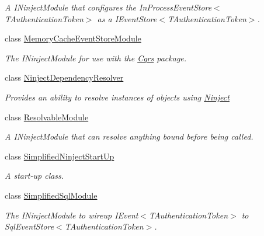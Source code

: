 \begin{DoxyCompactItemize}
\begin{DoxyCompactList}\small\item\em A I\+Ninject\+Module that configures the In\+Process\+Event\+Store$<$\+T\+Authentication\+Token$>$ as a I\+Event\+Store$<$\+T\+Authentication\+Token$>$. \end{DoxyCompactList}\item 
class \hyperlink{classCqrs_1_1Ninject_1_1Configuration_1_1MemoryCacheEventStoreModule}{Memory\+Cache\+Event\+Store\+Module}
\begin{DoxyCompactList}\small\item\em The I\+Ninject\+Module for use with the \hyperlink{namespaceCqrs}{Cqrs} package. \end{DoxyCompactList}\item 
class \hyperlink{classCqrs_1_1Ninject_1_1Configuration_1_1NinjectDependencyResolver}{Ninject\+Dependency\+Resolver}
\begin{DoxyCompactList}\small\item\em Provides an ability to resolve instances of objects using \hyperlink{namespaceCqrs_1_1Ninject}{Ninject} \end{DoxyCompactList}\item 
class \hyperlink{classCqrs_1_1Ninject_1_1Configuration_1_1ResolvableModule}{Resolvable\+Module}
\begin{DoxyCompactList}\small\item\em A I\+Ninject\+Module that can resolve anything bound before being called. \end{DoxyCompactList}\item 
class \hyperlink{classCqrs_1_1Ninject_1_1Configuration_1_1SimplifiedNinjectStartUp}{Simplified\+Ninject\+Start\+Up}
\begin{DoxyCompactList}\small\item\em A start-\/up class. \end{DoxyCompactList}\item 
class \hyperlink{classCqrs_1_1Ninject_1_1Configuration_1_1SimplifiedSqlModule}{Simplified\+Sql\+Module}
\begin{DoxyCompactList}\small\item\em The I\+Ninject\+Module to wireup I\+Event$<$\+T\+Authentication\+Token$>$ to Sql\+Event\+Store$<$\+T\+Authentication\+Token$>$. \end{DoxyCompactList}\end{DoxyCompactItemize}
